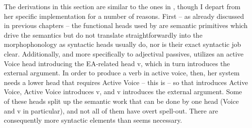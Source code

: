 \begin{exe}
\begin{xlist}
\begin{exe}
\begin{xlist}
\begin{exe}
\begin{exe}
\begin{xlist}
\begin{exe}
\begin{exe}
\begin{xlist}
\begin{exe}
\begin{xlist}
\begin{exe}
\begin{xlist}
\begin{exe}
\begin{xlist}
\begin{xlist}
\begin{exe}
\begin{xlist}
\begin{exe}
\begin{xlist}
\begin{exe}
\begin{exe}
\begin{exe}
\begin{xlist}
\begin{exe}
\begin{exe}
\begin{xlist}
\begin{exe}
\begin{xlist}
\begin{exe}
\begin{xlist}
\begin{exe}
\begin{xlist}
\begin{xlist}
\begin{exe}
\begin{xlist}
\begin{exe}
\begin{xlist}
\begin{exe}
\begin{xlist}
\begin{exe}
\begin{xlist}
\begin{exe}
\begin{exe}
\begin{exe}
\begin{exe}
\begin{exe}
\begin{xlist}
\begin{xlist}
The derivations in this section are similar to the ones in \cite{doron14adj}, though I depart from her specific implementation for a number of reasons. First -- as already discussed in previous chapters -- the functional heads used by \citeauthor{doron14adj} are semantic primitives which drive the semantics but do not translate straightforwardly into the morphophonology as syntactic heads usually do, nor is their exact syntactic job clear. Additionally, and more specifically to adjectival passives, \cite{doron14adj} utilizes an active Voice head introducing the EA-related head v, which in turn introduces the external argument. In order to produce a verb in active voice, then, her system needs a lower head that requires Active Voice -- this is  -- so that  introduces Active Voice, Active Voice introduces v, and v introduces the external argument. Some of these heads split up the semantic work that can be done by one head (Voice and v in particular), and not all of them have overt spell-out. There are consequently more syntactic elements than seems necessary. 



\end{xlist}
\end{xlist}
\end{exe}
\end{exe}
\end{exe}
\end{exe}
\end{exe}
\end{xlist}
\end{exe}
\end{xlist}
\end{exe}
\end{xlist}
\end{exe}
\end{xlist}
\end{exe}
\end{xlist}
\end{xlist}
\end{exe}
\end{xlist}
\end{exe}
\end{xlist}
\end{exe}
\end{xlist}
\end{exe}
\end{exe}
\end{xlist}
\end{exe}
\end{exe}
\end{exe}
\end{xlist}
\end{exe}
\end{xlist}
\end{exe}
\end{xlist}
\end{xlist}
\end{exe}
\end{xlist}
\end{exe}
\end{xlist}
\end{exe}
\end{xlist}
\end{exe}
\end{exe}
\end{xlist}
\end{exe}
\end{exe}
\end{xlist}
\end{exe}
\end{xlist}
\end{exe}
